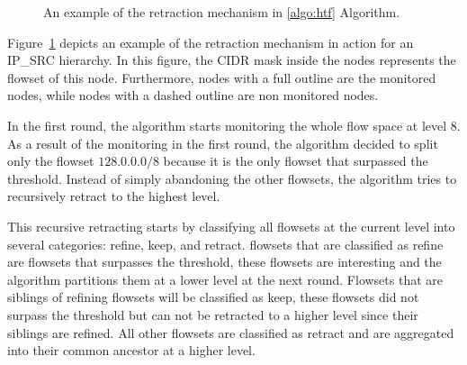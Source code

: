 \begin{figure}
	\centering
  \hfill
\caption{An example of the retraction mechanism in \ref{algo:htf} Algorithm.}
\label{fig:retract}

\end{figure}

Figure~\ref{fig:retract} depicts an example of the retraction mechanism in action for an IP\_SRC hierarchy. In this figure, the CIDR mask inside the nodes represents the flowset of this node. Furthermore, nodes with a full outline are the monitored nodes, while nodes with a dashed outline are non monitored nodes.

In the first round, the algorithm starts monitoring the whole flow space at level 8. As a result of the monitoring in the first round, the algorithm decided to split only the flowset $128.0.0.0/8$ because it is the only flowset that surpassed the threshold. Instead of simply abandoning the other flowsets, the algorithm tries to recursively retract to the highest level.

This recursive retracting starts by classifying all flowsets at the current level into several categories: refine, keep, and retract. flowsets that are classified as refine are flowsets that surpasses the threshold, these flowsets are interesting and the algorithm partitions them at a lower level at the next round. Flowsets that are siblings of refining flowsets will be classified as keep, these flowsets did not surpass the threshold but can not be retracted to a higher level since their siblings are refined. All other flowsets are classified as retract and are aggregated into their common ancestor at a higher level.

